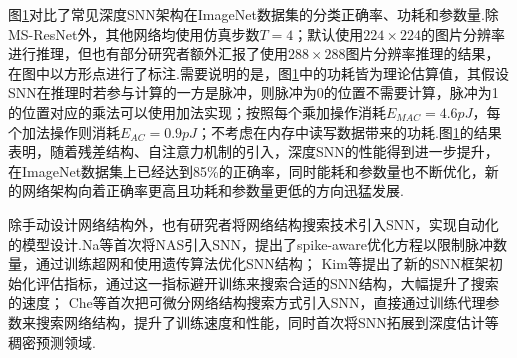 \documentclass{SCIS2020cn}
\begin{document}
\begin{figure}[htbp]
\centering
{}
\label{fig: network structure pow param acc}
\end{figure}

图\ref{fig: network structure pow param acc}对比了常见深度SNN架构在ImageNet数据集的分类正确率、功耗和参数量.除MS-ResNet外，其他网络均使用仿真步数$T=4$；默认使用$224\times224$的图片分辨率进行推理，但也有部分研究者额外汇报了使用$288\times288$图片分辨率推理的结果，在图中以方形点进行了标注.需要说明的是，图\ref{fig: network structure pow param acc}中的功耗皆为理论估算值，其假设SNN在推理时若参与计算的一方是脉冲，则脉冲为0的位置不需要计算，脉冲为1的位置对应的乘法可以使用加法实现；按照每个乘加操作消耗$E_{MAC}=4.6pJ$，每个加法操作则消耗$E_{AC}=0.9pJ$\cite{6757323}；不考虑在内存中读写数据带来的功耗.图\ref{fig: network structure pow param acc}的结果表明，随着残差结构、自注意力机制的引入，深度SNN的性能得到进一步提升，在ImageNet数据集上已经达到85\%的正确率，同时能耗和参数量也不断优化，新的网络架构向着正确率更高且功耗和参数量更低的方向迅猛发展.



除手动设计网络结构外，也有研究者将网络结构搜索技术引入SNN，实现自动化的模型设计.Na等\cite{na2022autosnn}首次将NAS引入SNN，提出了spike-aware优化方程以限制脉冲数量，通过训练超网和使用遗传算法优化SNN结构；
Kim等\cite{kim2022neural}提出了新的SNN框架初始化评估指标，通过这一指标避开训练来搜索合适的SNN结构，大幅提升了搜索的速度；
Che等\cite{che2022differentiable}首次把可微分网络结构搜索方式引入SNN，直接通过训练代理参数来搜索网络结构，提升了训练速度和性能，同时首次将SNN拓展到深度估计等稠密预测领域.
\end{document}
